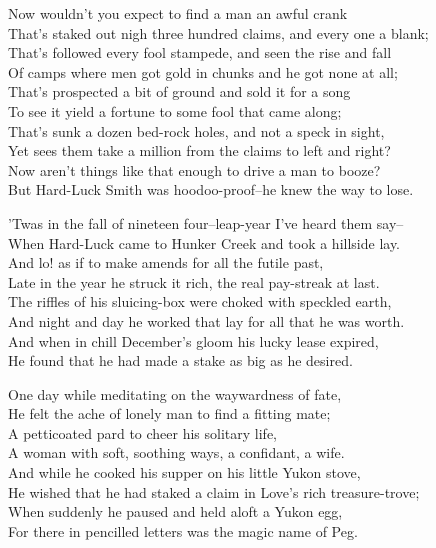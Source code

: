 
\begin{poemblock}
Now wouldn't you expect to find a man an awful crank\\
That's staked out nigh three hundred claims, and every one a blank;\\
That's followed every fool stampede, and seen the rise and fall\\
Of camps where men got gold in chunks and he got none at all;\\
That's prospected a bit of ground and sold it for a song\\
To see it yield a fortune to some fool that came along;\\
That's sunk a dozen bed-rock holes, and not a speck in sight,\\
Yet sees them take a million from the claims to left and right?\\
Now aren't things like that enough to drive a man to booze?\\
But Hard-Luck Smith was hoodoo-proof--he knew the way to lose.

'Twas in the fall of nineteen four--leap-year I've heard them say--\\
When Hard-Luck came to Hunker Creek and took a hillside lay.\\
And lo! as if to make amends for all the futile past,\\
Late in the year he struck it rich, the real pay-streak at last.\\
The riffles of his sluicing-box were choked with speckled earth,\\
And night and day he worked that lay for all that he was worth.\\
And when in chill December's gloom his lucky lease expired,\\
He found that he had made a stake as big as he desired.

One day while meditating on the waywardness of fate,\\
He felt the ache of lonely man to find a fitting mate;\\
A petticoated pard to cheer his solitary life,\\
A woman with soft, soothing ways, a confidant, a wife.\\
And while he cooked his supper on his little Yukon stove,\\
He wished that he had staked a claim in Love's rich treasure-trove;\\
When suddenly he paused and held aloft a Yukon egg,\\
For there in pencilled letters was the magic name of Peg.


\end{poemblock}
